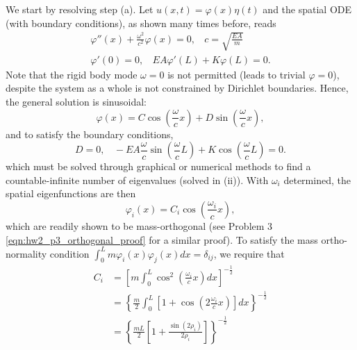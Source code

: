 \begin{enumerate}[(i)]
{    We start by resolving step (a). 
    Let $u(x, t) = \varphi(x)\eta(t)$ and the spatial ODE (with boundary conditions), as shown many times before, reads 
    \begin{equation}
    \begin{gathered}
        \varphi''(x) + \frac{\omega^2}{c^2}\varphi(x) = 0, ~~~~ c = \sqrt{\frac{EA}{m}} \\
        \varphi'(0) = 0, ~~~~ EA\varphi'(L) + K\varphi(L) = 0.
    \end{gathered}
    \end{equation}
    Note that the rigid body mode $\omega = 0$ is not permitted (leads to trivial $\varphi = 0$), despite the system as a whole is not constrained by Dirichlet boundaries. 
    Hence, the general solution is sinusoidal:
    \begin{equation}
        \varphi(x) = C \cos\left(\frac{\omega}{c} x\right) + D \sin\left(\frac{\omega}{c} x\right),
    \end{equation}
    and to satisfy the boundary conditions,
    \begin{equation}\label{eqn:hw3_p5_eigenvalue_eqn}
        D = 0, ~~~~ -EA\frac{\omega}{c} \sin\left(\frac{\omega}{c} L\right) + K \cos\left(\frac{\omega}{c} L\right) = 0.
    \end{equation}
    which must be solved through graphical or numerical methods to find a countable-infinite number of eigenvalues (solved in (ii)). 
    With $\omega_i$ determined, the spatial eigenfunctions are then 
    \begin{equation}
        \boxed{\varphi_i(x) = C_i \cos\left(\frac{\omega_i}{c} x\right)},  
    \end{equation}
    which are readily shown to be mass-orthogonal (see Problem 3 \cref{eqn:hw2_p3_orthogonal_proof} for a similar proof).
    To satisfy the mass ortho-normality condition $\int_0^L m\varphi_i(x) \varphi_j(x) dx = \delta_{ij}$, we require that 
    \begin{equation}
    \begin{aligned}
        C_i &= {\left[m\int_0^L \cos^2\left(\frac{\omega_i}{c} x\right) dx \right]}^{-\frac{1}{2}} \\
        &= { \left\{ \frac{m}{2}\int_0^L \left[1 + \cos\left(2\frac{\omega_i}{c} x\right) \right] dx \right\} }^{-\frac{1}{2}} \\
        &= { \left\{ \frac{mL}{2} \left[ 1 + \frac{\sin (2\rho_i)}{2\rho_i} \right] \right\} }^{-\frac{1}{2}} 
    \end{aligned}
    \end{equation}
}
\end{enumerate}

